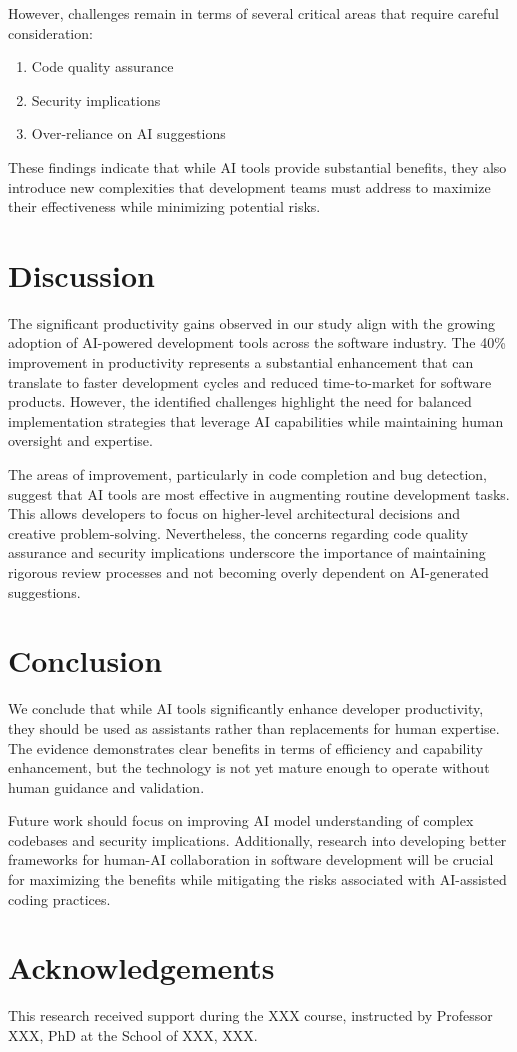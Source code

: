 \documentclass[twocolumn]{NobArticle}
\begin{document}
However, challenges remain in terms of several critical areas that require careful consideration:

\begin{enumerate}
    \item Code quality assurance
    \item Security implications
    \item Over-reliance on AI suggestions
\end{enumerate}

These findings indicate that while AI tools provide substantial benefits, they also introduce new complexities that development teams must address to maximize their effectiveness while minimizing potential risks.

\section{Discussion}

The significant productivity gains observed in our study align with the growing adoption of AI-powered development tools across the software industry. The 40\% improvement in productivity represents a substantial enhancement that can translate to faster development cycles and reduced time-to-market for software products. However, the identified challenges highlight the need for balanced implementation strategies that leverage AI capabilities while maintaining human oversight and expertise.

The areas of improvement, particularly in code completion and bug detection, suggest that AI tools are most effective in augmenting routine development tasks. This allows developers to focus on higher-level architectural decisions and creative problem-solving. Nevertheless, the concerns regarding code quality assurance and security implications underscore the importance of maintaining rigorous review processes and not becoming overly dependent on AI-generated suggestions.

\section{Conclusion}

We conclude that while AI tools significantly enhance developer productivity, they should be used as assistants rather than replacements for human expertise. The evidence demonstrates clear benefits in terms of efficiency and capability enhancement, but the technology is not yet mature enough to operate without human guidance and validation.

Future work should focus on improving AI model understanding of complex codebases and security implications. Additionally, research into developing better frameworks for human-AI collaboration in software development will be crucial for maximizing the benefits while mitigating the risks associated with AI-assisted coding practices.

\section*{Acknowledgements}
This research received support during the XXX course, instructed by Professor XXX, PhD at the School of XXX, XXX.

\printbibliography
\end{document}
